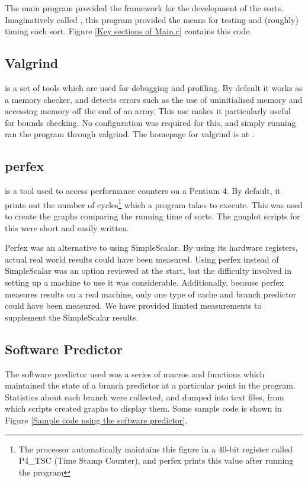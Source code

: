 The main program provided the framework for the development of the sorts.
Imaginatively called , this program provided the means for testing
and (roughly) timing each sort. Figure \vref{Key sections of Main.c} contains
this code.


\subsection{Valgrind}
\label{Valgrind}
 is a set of tools which are used for debugging and profiling.  By
default it works as a memory checker, and detects errors such as the use of
uninitialised memory and accessing memory off the end of an array. This use
makes it particularly useful for bounds checking. No configuration was required
for this, and simply running  ran the program through
valgrind. The homepage for valgrind is at .

\subsection{perfex}
 is a tool used to access performance counters on a Pentium 4. By default,
it prints out the number of cycles\footnote{The processor automatically
maintains this figure in a 40-bit register called P4\_TSC (Time Stamp Counter),
and perfex prints this value after running the program} which a program takes to
execute. This was used to create the graphs comparing the running time of sorts.
The gnuplot scripts for this were short and easily written.

Perfex was an alternative to using SimpleScalar. By using its hardware
registers, actual real world results could have been measured. Using perfex
instead of SimpleScalar was an option reviewed at the start, but the difficulty
involved in setting up a machine to use it was considerable. Additionally,
because perfex measures results on a real machine, only one type of cache and
branch predictor could have been measured. We have provided limited
measurements to supplement the SimpleScalar results.

\subsection{Software Predictor}
The software predictor used was a series of macros and functions which
maintained the state of a branch predictor at a particular point in the program.
Statistics about each branch were collected, and dumped into text files, from
which scripts created graphs to display them. Some sample code is shown in
Figure \ref{Sample code using the software predictor}.

